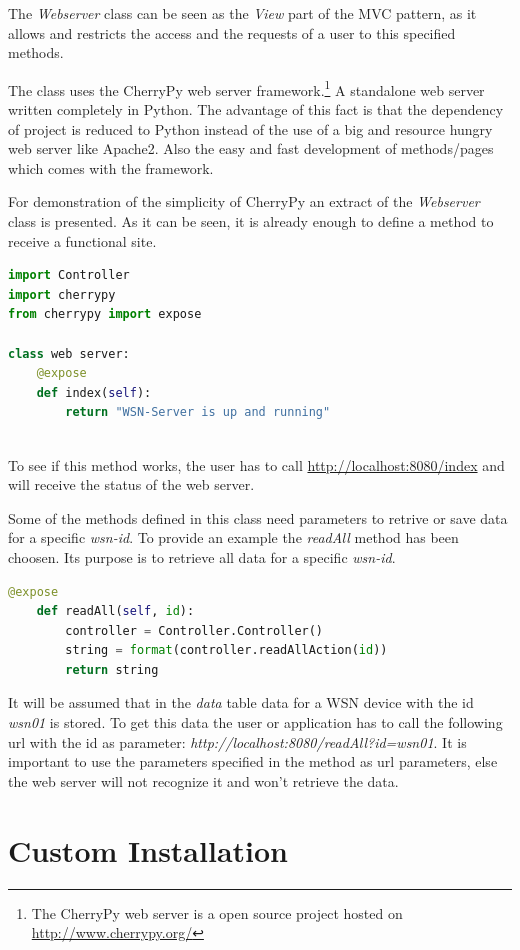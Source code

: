 The \textit{Webserver} class can be seen as the \textit{View} part of the MVC pattern, as it allows and restricts the access and the requests of a user to this specified methods.

The class uses the CherryPy web server framework.\footnote{The CherryPy web server is a open source project hosted on \url{http://www.cherrypy.org/}} A standalone web server written completely in Python. The advantage of this fact is that the dependency of project is reduced to Python instead of the use of a big and resource hungry web server like Apache2. Also the easy and fast development of methods/pages which comes with the framework.

For demonstration of the simplicity of CherryPy an extract of the \textit{Webserver} class is presented. As it can be seen, it is already enough to define a method to receive a functional site. 
\begin{lstlisting}[language=Python]
import Controller
import cherrypy
from cherrypy import expose

class web server:
    @expose
    def index(self):
        return "WSN-Server is up and running"
       
\end{lstlisting}

To see if this method works, the user has to call \url{http://localhost:8080/index} and will receive the status of the web server.

Some of the methods defined in this class need parameters to retrive or save data for a specific \textit{wsn-id}. To provide an example the \textit{readAll} method has been choosen. Its purpose is to retrieve all data for a specific \textit{wsn-id}.
\begin{lstlisting}[language=Python]
@expose
    def readAll(self, id):
        controller = Controller.Controller()
        string = format(controller.readAllAction(id))
        return string
\end{lstlisting}
It will be assumed that in the \textit{data} table data for a WSN device with the id \textit{wsn01} is stored. To get this data the user or application has to call the following url with the id as parameter: \textit{http://localhost:8080/readAll?id=wsn01}.
It is important to use the parameters specified in the method as url parameters, else the web server will not recognize it and won't retrieve the data. 

\newpage
\section{Custom Installation}
\label{sec:install}

